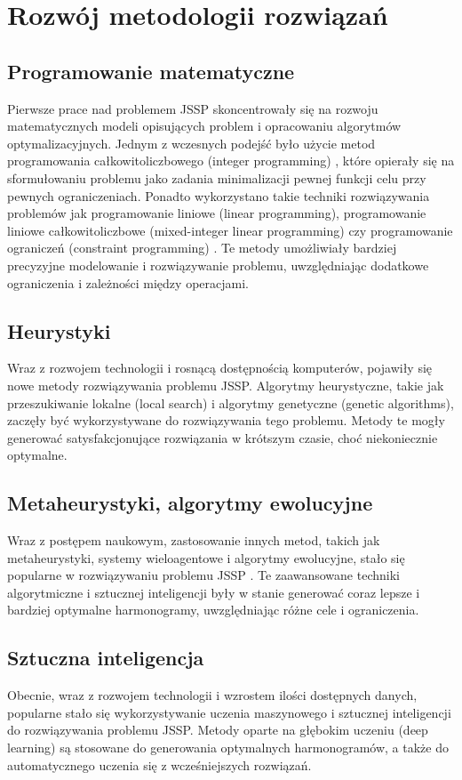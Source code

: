 \documentclass[12pt, a4paper]{report}
\begin{document}
\chapter{Rozwój metodologii rozwiązań}
  \section{Programowanie matematyczne}
    Pierwsze prace nad problemem JSSP skoncentrowały się na rozwoju matematycznych modeli opisujących problem i 
    opracowaniu algorytmów optymalizacyjnych. Jednym z wczesnych podejść było użycie metod programowania całkowitoliczbowego 
    (integer programming) \cite{IP} \cite{IP_2}, które opierały się na sformułowaniu problemu jako zadania minimalizacji 
    pewnej funkcji celu przy pewnych ograniczeniach. Ponadto wykorzystano takie techniki rozwiązywania problemów jak 
    programowanie liniowe (linear programming), programowanie liniowe całkowitoliczbowe
    (mixed-integer linear programming) czy programowanie ograniczeń (constraint programming) \cite{CP_1} \cite{CP_2}. 
    Te metody umożliwiały bardziej precyzyjne modelowanie i rozwiązywanie problemu, uwzględniając dodatkowe ograniczenia i zależności 
    między operacjami.

    \section{Heurystyki}
    Wraz z rozwojem technologii i rosnącą dostępnością komputerów, pojawiły się nowe metody rozwiązywania problemu JSSP. 
    Algorytmy heurystyczne, takie jak przeszukiwanie lokalne (local search) i algorytmy genetyczne (genetic algorithms), \cite{GA_1} \cite{GA_2}
    zaczęły być wykorzystywane do rozwiązywania tego problemu. Metody te mogły generować satysfakcjonujące rozwiązania w krótszym czasie,
    choć niekoniecznie optymalne.

    \section{Metaheurystyki, algorytmy ewolucyjne}
    Wraz z postępem naukowym, zastosowanie innych metod, takich jak metaheurystyki, systemy wieloagentowe i algorytmy ewolucyjne, 
    stało się popularne w rozwiązywaniu problemu JSSP \cite{MH_1} \cite{MH_2}. Te zaawansowane techniki algorytmiczne i sztucznej inteligencji były w stanie 
    generować coraz lepsze i bardziej optymalne harmonogramy, uwzględniając różne cele i ograniczenia.

    \section{Sztuczna inteligencja}
    Obecnie, wraz z rozwojem technologii i wzrostem ilości dostępnych danych, popularne stało się wykorzystywanie uczenia maszynowego i 
    sztucznej inteligencji do rozwiązywania problemu JSSP. Metody oparte na głębokim uczeniu (deep learning) są 
    stosowane do generowania optymalnych harmonogramów, a także do automatycznego uczenia się z wcześniejszych rozwiązań. \cite{AI_1} \cite{AI_2} \cite{AI_3}
\end{document}
